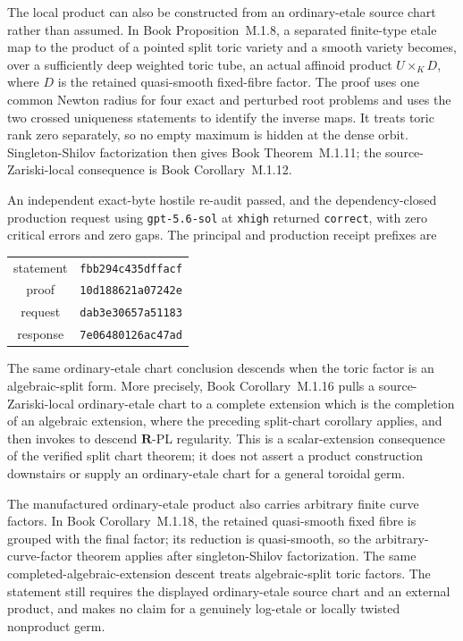 \documentclass[11pt,a4paper]{article}
\theoremstyle{definition}
\theoremstyle{remark}
\begin{document}
The local product can also be constructed from an ordinary-etale source
chart rather than assumed.  In
Book Proposition~M.1.8, a separated finite-type etale map to
the product of a pointed split toric variety and a smooth variety becomes,
over a sufficiently deep weighted toric tube, an actual affinoid product
\(
 U\times_KD
\), where \(D\) is the retained quasi-smooth fixed-fibre factor.  The proof
uses one common Newton radius for four exact and perturbed root problems and
uses the two crossed uniqueness statements to identify the inverse maps.
It treats toric rank zero separately, so no empty maximum is hidden at the
dense orbit.  Singleton-Shilov factorization then gives
Book Theorem~M.1.11; the source-Zariski-local
consequence is Book Corollary~M.1.12.

An independent exact-byte hostile re-audit passed, and the dependency-closed
production request using \texttt{gpt-5.6-sol} at \texttt{xhigh} returned
\texttt{correct}, with zero critical errors and zero gaps.  The principal
and production receipt prefixes are
\begin{center}
  \small
  \begin{tabular}{@{}cc@{}}
    statement & \texttt{fbb294c435dffacf} \\
    proof & \texttt{10d188621a07242e} \\
    request & \texttt{dab3e30657a51183} \\
    response & \texttt{7e06480126ac47ad}
  \end{tabular}
\end{center}

The same ordinary-etale chart conclusion descends when the toric factor is an
algebraic-split form.  More precisely,
Book Corollary~M.1.16 pulls a
source-Zariski-local ordinary-etale chart to a complete extension which is
the completion of an algebraic extension, where the preceding split-chart
corollary applies, and then invokes \cite[Corollary~5.12]{GJR26} to descend
\(\mathbf R\)-PL regularity.  This is a scalar-extension consequence of the
verified split chart theorem; it does not assert a product construction
downstairs or supply an ordinary-etale chart for a general toroidal germ.

The manufactured ordinary-etale product also carries arbitrary finite curve
factors.  In
Book Corollary~M.1.18, the retained
quasi-smooth fixed fibre is grouped with the final factor; its reduction is
quasi-smooth, so the arbitrary-curve-factor theorem applies after
singleton-Shilov factorization.  The same completed-algebraic-extension
descent treats algebraic-split toric factors.  The statement still requires
the displayed ordinary-etale source chart and an external product, and makes
no claim for a genuinely log-etale or locally twisted nonproduct germ.
\end{document}
